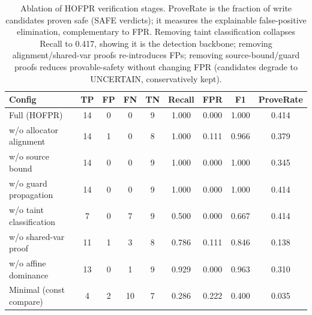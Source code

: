 \begin{table}[t]
\centering
\small
\begin{tabular}{lcccccccc}
\toprule
Config & TP & FP & FN & TN & Recall & FPR & F1 & ProveRate \\
\midrule
  Full (HOFPR) & 14 & 0 & 0 & 9 & 1.000 & 0.000 & 1.000 & 0.414 \\
  w/o allocator alignment & 14 & 1 & 0 & 8 & 1.000 & 0.111 & 0.966 & 0.379 \\
  w/o source bound & 14 & 0 & 0 & 9 & 1.000 & 0.000 & 1.000 & 0.345 \\
  w/o guard propagation & 14 & 0 & 0 & 9 & 1.000 & 0.000 & 1.000 & 0.414 \\
  w/o taint classification & 7 & 0 & 7 & 9 & 0.500 & 0.000 & 0.667 & 0.414 \\
  w/o shared-var proof & 11 & 1 & 3 & 8 & 0.786 & 0.111 & 0.846 & 0.138 \\
  w/o affine dominance & 13 & 0 & 1 & 9 & 0.929 & 0.000 & 0.963 & 0.310 \\
  Minimal (const compare) & 4 & 2 & 10 & 7 & 0.286 & 0.222 & 0.400 & 0.035 \\
\bottomrule
\end{tabular}
\caption{Ablation of HOFPR verification stages. ProveRate is the
fraction of write candidates proven safe (SAFE verdicts); it measures
the explainable false-positive elimination, complementary to FPR.
Removing taint classification collapses Recall to 0.417, showing it is
the detection backbone; removing alignment/shared-var proofs re-introduces
FPs; removing source-bound/guard proofs reduces provable-safety without
changing FPR (candidates degrade to UNCERTAIN, conservatively kept).}
\label{tab:ablation}
\end{table}
